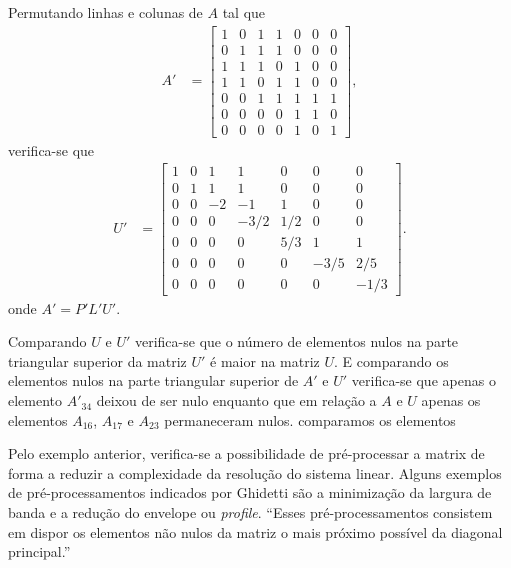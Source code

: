 Permutando linhas e colunas de $A$ tal que
\begin{align*}
    A' &= \begin{bmatrix}
        1 & 0 & 1 & 1 & 0 & 0 & 0 \\
        0 & 1 & 1 & 1 & 0 & 0 & 0 \\
        1 & 1 & 1 & 0 & 1 & 0 & 0 \\
        1 & 1 & 0 & 1 & 1 & 0 & 0 \\
        0 & 0 & 1 & 1 & 1 & 1 & 1 \\
        0 & 0 & 0 & 0 & 1 & 1 & 0 \\
        0 & 0 & 0 & 0 & 1 & 0 & 1
    \end{bmatrix},
\end{align*}
verifica-se que
\begin{align*}
    U' &= \begin{bmatrix}
        1 &    0 &    1 &    1 &    0 &    0 &    0 \\
        0 &    1 &    1 &    1 &    0 &    0 &    0 \\
        0 &    0 &   -2 &   -1 &    1 &    0 &    0 \\
        0 &    0 &    0 & -3/2 &  1/2 &    0 &    0 \\
        0 &    0 &    0 &    0 &  5/3 &    1 &    1 \\
        0 &    0 &    0 &    0 &    0 & -3/5 &  2/5 \\
        0 &    0 &    0 &    0 &    0 &    0 & -1/3
    \end{bmatrix}.
\end{align*}
onde $A' = P' L' U'$.

Comparando $U$ e $U'$ verifica-se que o número de elementos nulos na parte
triangular superior da matriz $U'$ é maior na matriz $U$. E
comparando os elementos nulos na parte triangular superior de $A'$ e $U'$
verifica-se que apenas o elemento $A'_{34}$ deixou de ser nulo
enquanto que em relação a $A$ e $U$ apenas os elementos $A_{16}$,
$A_{17}$ e $A_{23}$ permaneceram nulos.
comparamos os elementos 

Pelo exemplo anterior, verifica-se a possibilidade de pré-processar a matrix
de forma a reduzir a complexidade da resolução do sistema linear. Alguns
exemplos de pré-processamentos indicados por Ghidetti
\cite{Ghidetti:2010:ComparativoReordenamento} são a minimização da
largura de banda e a redução do envelope ou \textit{profile}. ``Esses
pré-processamentos consistem em dispor os elementos não nulos da matriz o mais
próximo possível da diagonal principal.''

